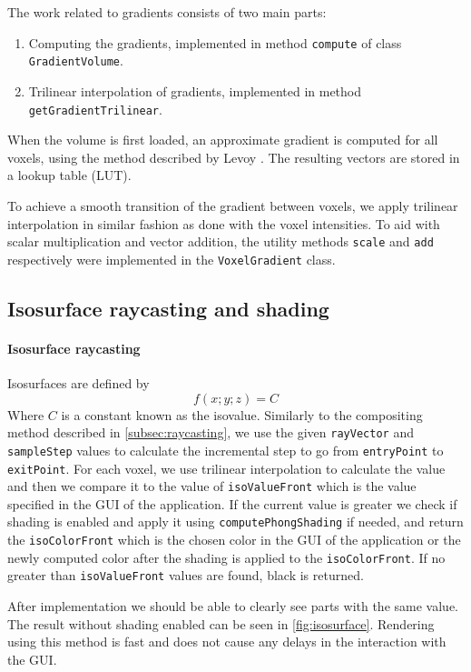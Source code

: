 \documentclass[a4paper]{article}
\begin{document}
The work related to gradients consists of two main parts:

\begin{enumerate}[noitemsep]
  \item Computing the gradients, implemented in method {\tt compute} of class {\tt GradientVolume}.
  \item Trilinear interpolation of gradients, implemented in method {\tt getGradientTrilinear}.
\end{enumerate}

\noindent When the volume is first loaded, an approximate gradient is computed for all voxels, using the method described by Levoy \citep{levoy_1988}. The resulting vectors are stored in a lookup table (LUT).

To achieve a smooth transition of the gradient between voxels, we apply trilinear interpolation in similar fashion as done with the voxel intensities. To aid with scalar multiplication and vector addition, the utility methods {\tt scale} and {\tt add} respectively were implemented in the {\tt VoxelGradient} class.

\subsection{Isosurface raycasting and shading}
\label{subsec:isosurface}

\paragraph{Isosurface raycasting}

Isosurfaces are defined by
 $$f(x; y; z) = C$$ 
Where $C$ is a constant known as the isovalue. Similarly to the compositing method described in \autoref{subsec:raycasting}, we use the given {\tt rayVector} and {\tt sampleStep} values to calculate the incremental step to go from {\tt entryPoint} to {\tt exitPoint}. For each voxel, we use trilinear interpolation to calculate the value and then we compare it to the value of {\tt isoValueFront} which is the value specified in the GUI of the application. If the current value is greater we check if shading is enabled and apply it using {\tt computePhongShading} if needed, and return the {\tt isoColorFront} which is the chosen color in the GUI of the application or the newly computed color after the shading is applied to the  {\tt isoColorFront}. If no greater than {\tt isoValueFront} values are found, black is returned.

After implementation we should be able to clearly see parts with the same value. The result without shading enabled can be seen in \autoref{fig:isosurface}. Rendering using this method is fast and does not cause any delays in the interaction with the GUI.
\end{document}
